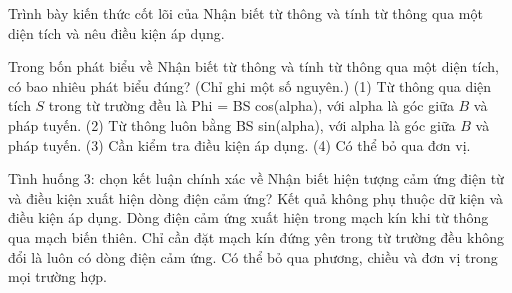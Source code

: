 \begin{bt}
Trình bày kiến thức cốt lõi của Nhận biết từ thông và tính từ thông qua một diện tích và nêu điều kiện áp dụng.
\end{bt}

\begin{ex}
Trong bốn phát biểu về Nhận biết từ thông và tính từ thông qua một diện tích, có bao nhiêu phát biểu đúng? (Chỉ ghi một số nguyên.) (1) Từ thông qua diện tích $S$ trong từ trường đều là Phi = BS cos(alpha), với alpha là góc giữa $B$ và pháp tuyến. (2) Từ thông luôn bằng BS sin(alpha), với alpha là góc giữa $B$ và pháp tuyến. (3) Cần kiểm tra điều kiện áp dụng. (4) Có thể bỏ qua đơn vị.
\end{ex}

\begin{ex}
Tình huống 3: chọn kết luận chính xác về Nhận biết hiện tượng cảm ứng điện từ và điều kiện xuất hiện dòng điện cảm ứng?
\choice
{Kết quả không phụ thuộc dữ kiện và điều kiện áp dụng.}
{\True Dòng điện cảm ứng xuất hiện trong mạch kín khi từ thông qua mạch biến thiên.}
{Chỉ cần đặt mạch kín đứng yên trong từ trường đều không đổi là luôn có dòng điện cảm ứng.}
{Có thể bỏ qua phương, chiều và đơn vị trong mọi trường hợp.}
\end{ex}

